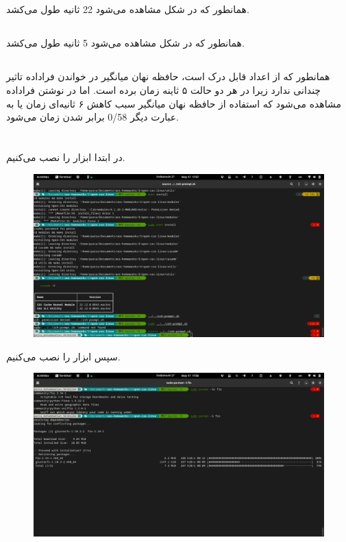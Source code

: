 \documentclass{article}
\begin{document}
\subsection{}
همانطور که در شکل مشاهده می‌شود 22 ثانیه طول می‌کشد.

\subsection{}
همانطور که در شکل مشاهده می‌شود 5 ثانیه طول می‌کشد.

\subsection{}
همانطور که از اعداد قابل درک است،‌ حافظه نهان میانگیر در خواندن فراداده 
تاثیر چندانی ندارد زیرا در هر دو حالت ۵ ثاینه زمان برده است. اما در نوشتن فراداده 
مشاهده می‌شود که استفاده از حافظه نهان میانگیر 
سبب کاهش ۶ ثانیه‌ای زمان یا به عبارت دیگر 
0/58
برابر شدن زمان می‌شود.

\section{}
در ابتدا ابزار 
را نصب می‌کنیم.

\begin{figure}[H]
    \centering
    \includegraphics[width=\textwidth]{images/installing-open-cas.png}
\end{figure}

سپس ابزار 
را نصب می‌کنیم.

\begin{figure}[H]
    \centering
    \includegraphics[width=\textwidth]{images/installing-fio.png}
\end{figure}
\end{document}
